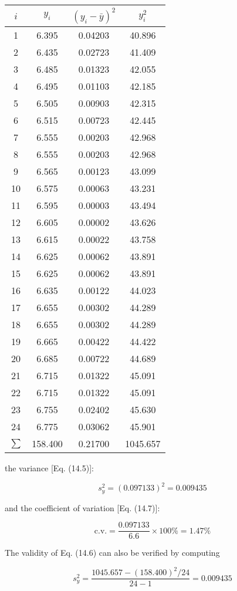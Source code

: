 \documentclass[../main.tex]{subfiles}
\begin{document}
\begin{example}
	\begin{tabular}{cccc}
		$i$ & $y_i$ & $(y_i - \bar{y})^2$ & $y_i^2$\\
		\hline
		1 & 6.395 & 0.04203 & 40.896 \\
		2 & 6.435 & 0.02723 & 41.409 \\
		3 & 6.485 & 0.01323 & 42.055 \\
		4 & 6.495 & 0.01103 & 42.185 \\
		5 & 6.505 & 0.00903 & 42.315 \\
		6 & 6.515 & 0.00723 & 42.445 \\
		7 & 6.555 & 0.00203 & 42.968 \\
		8 & 6.555 & 0.00203 & 42.968 \\
		9 & 6.565 & 0.00123 & 43.099 \\ 
		10 & 6.575 & 0.00063 & 43.231 \\
		11 & 6.595 & 0.00003 & 43.494 \\
		12 & 6.605 & 0.00002 & 43.626 \\ 
		13 & 6.615 & 0.00022 & 43.758 \\
		14 & 6.625 & 0.00062 & 43.891 \\
		15 & 6.625 & 0.00062 & 43.891 \\ 
		16 & 6.635 & 0.00122 & 44.023 \\
		17 & 6.655 & 0.00302 & 44.289 \\
		18 & 6.655 & 0.00302 & 44.289 \\ 
		19 & 6.665 & 0.00422 & 44.422 \\
		20 & 6.685 & 0.00722 & 44.689 \\
		21 & 6.715 & 0.01322 & 45.091 \\ 
		22 & 6.715 & 0.01322 & 45.091 \\
		23 & 6.755 & 0.02402 & 45.630 \\
		24 & 6.775 & 0.03062 & 45.901 \\ 
		$\sum$ &158.400 & 0.21700 & 1045.657
	\end{tabular}

	\noindent the variance [Eq. (14.5)]:

	$$
	s^2_y = (0.097133)^2 = 0.009435
	$$

	\noindent and the coefficient of variation [Eq. (14.7)]:

	$$
		\text{c.v.} = \frac{0.097133}{6.6 } \times 100\% = 1.47\%
	$$

	\noindent The validity of Eq. (14.6) can also be verified by computing

	$$
		s^2_y = \frac{1045.657 - (158.400)^2 /24}{24 - 1} = 0.009435
	$$

\end{example}
\end{document}
